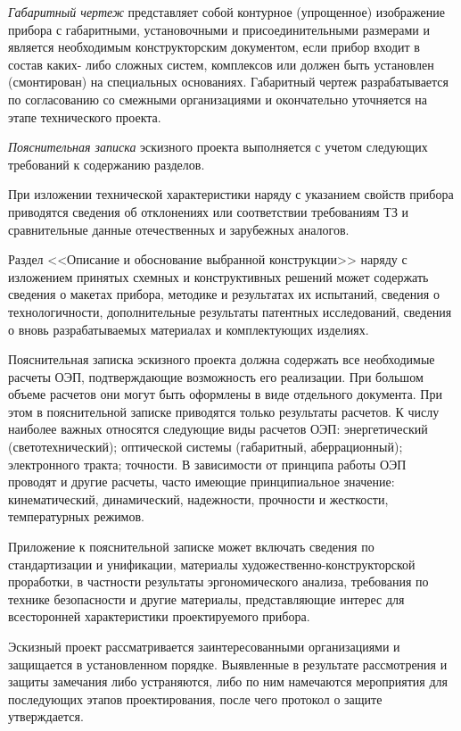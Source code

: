 \textit{Габаритный чертеж} представляет собой контурное (упрощенное) изображение прибора с габаритными, установочными и присоединительными размерами и является необходимым конструкторским документом, если прибор входит в состав каких- либо сложных систем, комплексов или должен быть установлен (смонтирован) на специальных основаниях. Габаритный чертеж разрабатывается по согласованию со смежными организациями и окончательно уточняется на этапе технического проекта.

\textit{Пояснительная записка} эскизного проекта выполняется с учетом следующих требований к содержанию разделов.

При изложении технической характеристики наряду с указанием свойств прибора приводятся сведения об отклонениях или соответствии требованиям ТЗ и сравнительные данные отечественных и зарубежных аналогов.

Раздел <<Описание и обоснование выбранной конструкции>> наряду с изложением принятых схемных и конструктивных решений может содержать сведения о макетах прибора, методике и результатах их испытаний, сведения о технологичности, дополнительные результаты патентных исследований, сведения о вновь разрабатываемых материалах и комплектующих изделиях.

Пояснительная записка эскизного проекта должна содержать все необходимые расчеты ОЭП, подтверждающие возможность его реализации. При большом объеме расчетов они могут быть оформлены в виде отдельного документа. При этом в пояснительной записке приводятся только результаты расчетов.
К числу наиболее важных относятся следующие виды расчетов ОЭП: энергетический (светотехнический); оптической системы (габаритный, аберрационный); электронного тракта; точности. В зависимости от принципа работы ОЭП проводят и другие расчеты, часто имеющие принципиальное значение: кинематический, динамический, надежности, прочности и жесткости, температурных режимов.

Приложение к пояснительной записке может включать сведения по стандартизации и унификации, материалы художественно-конструкторской проработки, в частности результаты эргономического анализа, требования по технике безопасности и другие материалы, представляющие интерес для всесторонней характеристики проектируемого прибора.

Эскизный проект рассматривается заинтересованными организациями и защищается в установленном порядке. Выявленные в результате рассмотрения и защиты замечания либо устраняются, либо по ним намечаются мероприятия для последующих этапов проектирования, после чего протокол о защите утверждается.

